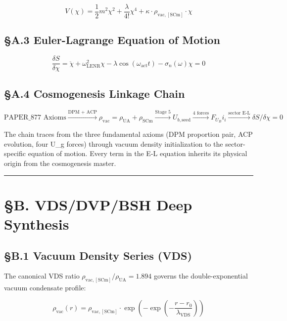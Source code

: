 \documentclass[12pt,a4paper]{article}
\begin{document}
\begin{equation}
V(\chi) = \frac{1}{2} m^2 \chi^2 + \frac{\lambda}{4!} \chi^4 + \kappa \cdot \rho_{\mathrm{vac,[SCm]}} \cdot \chi
\end{equation}

\subsection{\S{}A.3 Euler-Lagrange Equation of Motion}

\begin{equation}
\boxed{\frac{\delta S}{\delta \chi} = \ddot{\chi} + \omega_{\mathrm{LENR}}^2 \chi - \lambda \cos(\omega_{\mathrm{act}} t) - \sigma_n(\omega)\chi = 0}
\end{equation}

\subsection{\S{}A.4 Cosmogenesis Linkage Chain}

\begin{equation}
\text{PAPER\_877 Axioms} \xrightarrow{\text{DPM + ACP}} \rho_{\mathrm{vac}} = \rho_{\mathrm{UA}} + \rho_{\mathrm{SCm}} \xrightarrow{\text{Stage 5}} U_{b,\mathrm{seed}} \xrightarrow{\text{4 forces}} F_U_Bi_i \xrightarrow{\text{sector E-L}} \delta S/\delta \chi = 0
\end{equation}

The chain traces from the three fundamental axioms (DPM proportion pair, ACP evolution, four U\_g forces) through vacuum density initialization to the sector-specific equation of motion. Every term in the E-L equation inherits its physical origin from the cosmogenesis master.

\medskip\hrule\medskip

\section{\S{}B. VDS/DVP/BSH Deep Synthesis}

\subsection{\S{}B.1 Vacuum Density Series (VDS)}

The canonical VDS ratio $\rho_{\mathrm{vac,[SCm]}} / \rho_{\mathrm{UA}} = 1.894$ governs the double-exponential vacuum condensate profile:

\begin{equation}
\rho_{\mathrm{vac}}(r) = \rho_{\mathrm{vac,[SCm]}} \cdot \exp\!\left(-\exp\!\left(-\frac{r - r_0}{\lambda_{\mathrm{VDS}}}\right)\right)
\end{equation}
\end{document}

